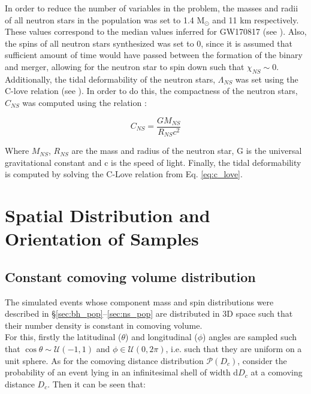     In order to reduce the number of variables in the problem, the masses and radii of
    all neutron stars in the population was set to 1.4 M$_\odot$ and 11 km respectively.
    These values correspond to the median values inferred for GW170817 (see
    \cite{abbott_2018}). Also, the spins of all neutron stars synthesized was set to 0,
    since it is assumed that sufficient amount of time would have passed between the
    formation of the binary and merger, allowing for the neutron star to spin down such
    that $\chi_{NS} \sim 0$.\\
    Additionally, the tidal deformability of the neutron stars, $\Lambda_{NS}$ was set
    using the C-love relation (see \cite{yagi_2017}). In order to do this, the
    compactness of the neutron stars, $C_{NS}$ was computed using the relation :

    \begin{equation}
        C_{NS} = \dfrac{G M_{NS}}{R_{NS} c^2}
    \end{equation}

    Where $M_{NS}$, $R_{NS}$ are the mass and radius of the neutron star, G is the
    universal gravitational constant and c is the speed of light.  Finally, the tidal
    deformability is computed by solving the C-Love relation from Eq. \ref{eq:c_love}.

\section{Spatial Distribution and Orientation of Samples}\label{sec:space_dist}

    \subsection{Constant comoving volume distribution}

        The simulated events whose component mass and spin distributions were described
        in \S\ref{sec:bh_pop}--\ref{sec:ns_pop} are distributed in 3D space such that
        their number density is constant in comoving volume.\\ For this, firstly the
        latitudinal ($\theta$) and longitudinal ($\phi$) angles are sampled such that
        $\cos \theta \sim \mathcal{U}(-1, 1)$ and $\phi \in \mathcal{U}(0, 2\pi)$, i.e.
        such that they are uniform on a unit sphere. As for the comoving distance
        distribution $\mathcal{P}(D_c)$, consider the probability of an event lying in
        an infinitesimal shell of width d$D_c$ at a comoving distance $D_c$.  Then it
        can be seen that:

